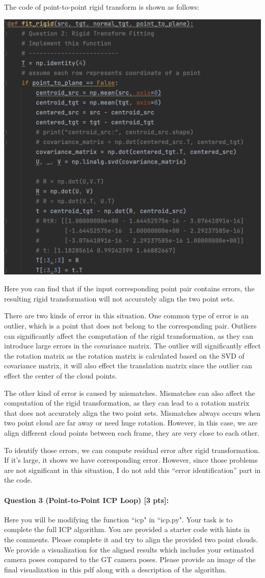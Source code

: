 \documentclass[11pt]{article}
\begin{document}
The code of point-to-point rigid transform is shown as follows:
\begin{center}
    \small
    \includegraphics[width=0.5\linewidth]{fig/Q2code.png}
\end{center}
Here you can find that if the input corresponding point pair contains errors, the resulting rigid transformation will not accurately align the two point sets.

There are two kinds of error in this situation. One common type of error is an outlier, which is a point that does not belong to the corresponding pair. Outliers can significantly affect the computation of the rigid transformation, as they can introduce large errors in the covariance matrix. The outlier will significantly effect the rotation matrix as the rotation matrix is calculated based on the SVD of covariance matrix, it will also effect the translation matrix since the outlier can effect the center of the cloud points.

The other kind of error is caused by mismatches. Mismatches can also affect the computation of the rigid transformation, as they can lead to a rotation matrix that does not accurately align the two point sets. Mismatches always occurs when two point cloud are far away or need huge rotation. However, in this case, we are align different cloud points between each frame, they are very close to each other.

To identify those errors, we can compute residual error after rigid transformation. If it's large, it shows we have corresponding error. However, since those problems are not significant in this situation, I do not add this ``error identification'' part in the code.

\paragraph{Question 3 (Point-to-Point ICP Loop) [3 pts]:} Here you will be modifying the function ``icp" in ``icp.py". Your task is to complete the full ICP algorithm. You are provided a starter code with hints in the comments. Please complete it and try to align the provided two point clouds. We provide a visualization for the aligned results which includes your estimated camera poses compared to the GT camera poses. Please provide an image of the final visualization in this pdf along with a description of the algorithm.
\end{document}
